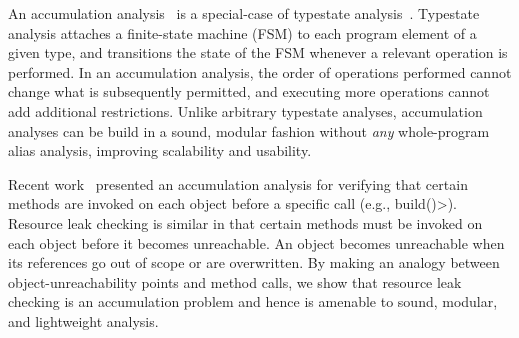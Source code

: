 An accumulation analysis~\cite{KelloggRSSE2020}
is a special-case of typestate analysis~\cite{StromY86}.
Typestate analysis attaches a finite-state machine (FSM)
to each program element of a given type, and transitions the state of the
FSM whenever a relevant operation is performed.
In an accumulation analysis,
the order of operations performed cannot change what is subsequently
permitted, and executing more operations cannot add additional
restrictions.  Unlike arbitrary typestate analyses, accumulation analyses can
be build in a sound, modular fashion without \emph{any} whole-program alias
analysis, improving scalability and usability.

Recent work~\cite{KelloggRSSE2020} presented an accumulation analysis for
verifying that certain methods are invoked on each object
before a specific call (e.g., \<build()>).
Resource leak checking is similar in that certain methods must be invoked
on each object before it becomes unreachable.
An object becomes unreachable when its references go out
of scope or are overwritten.
By making an analogy between object-unreachability points and
method calls, we show that resource leak checking is an accumulation
problem and hence is amenable to sound, modular, and lightweight analysis.


